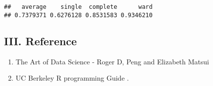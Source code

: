 \documentclass[]{article}
\providecommand{\tightlist}{%
  \setlength{\itemsep}{0pt}\setlength{\parskip}{0pt}}
\begin{document}
\begin{verbatim}
##   average    single  complete      ward 
## 0.7379371 0.6276128 0.8531583 0.9346210
\end{verbatim}

\subsection{III. Reference}\label{iii.-reference}

\begin{enumerate}
\def\labelenumi{\arabic{enumi}.}
\tightlist
\item
  The Art of Data Science - Roger D, Peng and Elizabeth Matsui
\item
  UC Berkeley R programming Guide .
\end{enumerate}
\end{document}
